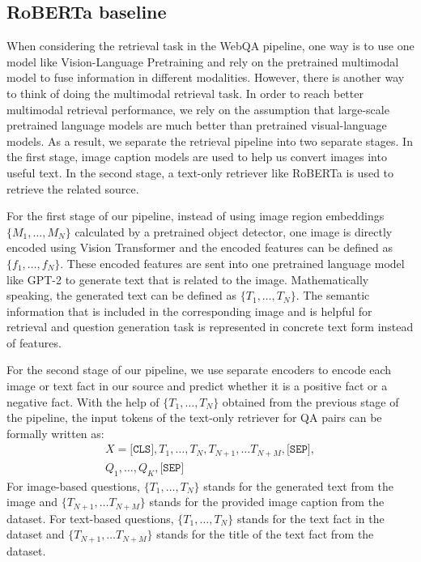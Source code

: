 \documentclass[nohyperref]{article}
\theoremstyle{plain}
\theoremstyle{definition}
\theoremstyle{remark}
\begin{document}
\subsection{RoBERTa baseline}
When considering the retrieval task in the WebQA pipeline, one way is to use one model like Vision-Language Pretraining and rely on the pretrained multimodal model to fuse information in different modalities. However, there is another way to think of doing the multimodal retrieval task. In order to reach better multimodal retrieval performance, we rely on the assumption that large-scale pretrained language models are much better than pretrained visual-language models. As a result, we separate the retrieval pipeline into two separate stages. In the first stage, image caption models are used to help us convert images into useful text. In the second stage, a text-only retriever like RoBERTa \citep{roberta} is used to retrieve the related source. \par 

For the first stage of our pipeline, instead of using image region embeddings $\{M_1, \dots, M_N\}$ calculated by a pretrained object detector, one image is directly encoded using Vision Transformer \citep{vit} and the encoded features can be defined as $\{f_1, \dots, f_N\}$. These encoded features are sent into one pretrained language model like GPT-2 \citep{gpt2} to generate text that is related to the image. Mathematically speaking, the generated text can be defined as $\{T_1, \dots, T_N\}$. The semantic information that is included in the corresponding image and is helpful for retrieval and question generation task is represented in concrete text form instead of features. \par 

For the second stage of our pipeline, we use separate encoders to encode each image or text fact in our source and predict whether it is a positive fact or a negative fact. With the help of $\{T_1, \dots, T_N\}$ obtained from the previous stage of the pipeline, the input tokens of the text-only retriever for QA pairs can be formally written as: 
\begin{gather*}
    X = \texttt{[CLS]}, T_1, \dots, T_N, T_{N+1}, \dots T_{N+M}, \texttt{[SEP]}, \\
    Q_1, \dots, Q_K, \texttt{[SEP]}
\end{gather*}
For image-based questions, $\{T_1, \dots, T_N\}$ stands for the generated text from the image and $\{T_{N+1}, \dots T_{N+M}\}$ stands for the provided image caption from the dataset. For text-based questions, $\{T_1, \dots, T_N\}$ stands for the text fact in the dataset and $\{T_{N+1}, \dots T_{N+M}\}$ stands for the title of the text fact from the dataset.\par 
\end{document}
